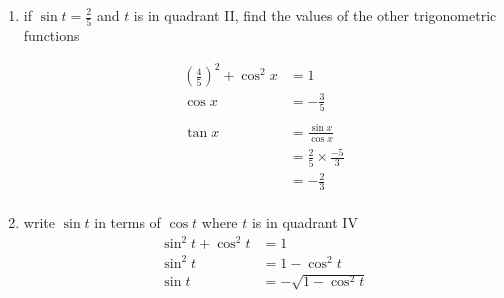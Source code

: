 \documentclass{exam}
\begin{document}
  \begin{enumerate}
    \item if $\sin t = \frac{2}{5}$ and $t$ is in quadrant II, find the values of the other trigonometric functions

      \begin{align*}
        \left( \frac{4}{5} \right)^2 + \cos^2 x & = 1 \\
        \cos x                                  & = - \frac{3}{5} \\
        \\
        \tan x & = \frac{\sin x}{\cos x} \\
               & = \frac{2}{5} \times \frac{-5}{3} \\
               & = - \frac{2}{3} \\
      \end{align*}

    \item write $\sin t$ in terms of $\cos t$ where $t$ is in quadrant IV
      \begin{align*}
        \sin^2 t + \cos^2 t & = 1 \\
        \sin^2 t            & = 1 - \cos^2 t \\
        \sin t              & = - \sqrt{ 1 - \cos^2 t } \\
      \end{align*}
  \end{enumerate}
\end{document}
